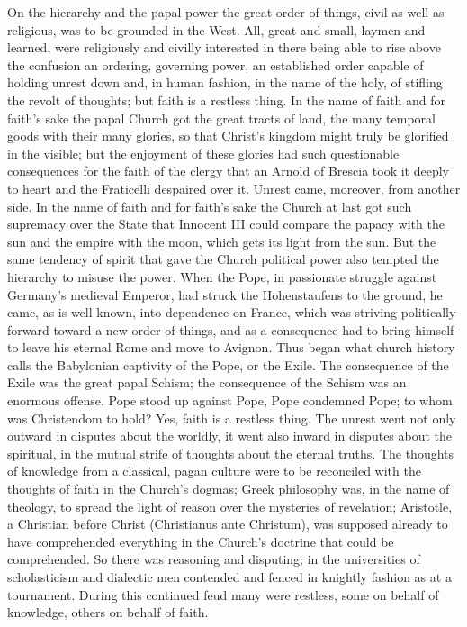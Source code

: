 \documentclass[12pt]{book}
\newcommand{\opage}[1]{\marginnote{\footnotesize\textit{[#1]}}}
\begin{document}
On the hierarchy and the papal power the great order of things, civil as well
as religious, was to be grounded in the West. All, great and small, laymen and
learned, were religiously and civilly interested in there being able to rise
above the confusion an ordering, governing power, an established order capable
of holding unrest down and, in human fashion, in the name of the holy, of
stifling the revolt of thoughts; but faith is a restless thing. In the name of
faith and for faith's sake the papal Church got the great tracts of land, the
many temporal goods with their many glories, so that Christ's kingdom might
truly be glorified in the visible; but the enjoyment of these glories had such
questionable consequences for the faith of the clergy that an Arnold of
Brescia took it deeply to heart and the Fraticelli despaired over it. Unrest
came, moreover, from another side. In the name of faith and for faith's sake
the Church at last got such supremacy over the State that Innocent III could
compare the papacy with the sun and the empire with the moon, which gets its
light from the sun. But the same tendency of spirit that gave the Church
political power also tempted the hierarchy to misuse the power. When the Pope,
in passionate struggle against Germany's medieval Emperor,
\opage{263}\setcounter{footnote}{0}%
had struck the Hohenstaufens to the ground, he came, as is well known, into
dependence on France, which was striving politically forward toward a new
order of things, and as a consequence had to bring himself to leave his
eternal Rome and move to Avignon. Thus began what church history calls the
Babylonian captivity of the Pope, or the Exile. The consequence of the Exile
was the great papal Schism; the consequence of the Schism was an enormous
offense. Pope stood up against Pope, Pope condemned Pope; to whom was
Christendom to hold? Yes, faith is a restless thing. The unrest went not only
outward in disputes about the worldly, it went also inward in disputes about
the spiritual, in the mutual strife of thoughts about the eternal truths. The
thoughts of knowledge from a classical, pagan culture were to be reconciled
with the thoughts of faith in the Church's dogmas; Greek philosophy was, in
the name of theology, to spread the light of reason over the mysteries of
revelation; Aristotle, a Christian before Christ (Christianus ante Christum),
was supposed already to have comprehended everything in the Church's doctrine
that could be comprehended. So there was reasoning and disputing; in the
universities of scholasticism and dialectic men contended and fenced in
knightly fashion as at a tournament. During this continued feud many were
restless, some on behalf of knowledge, others on behalf of faith.
\end{document}
